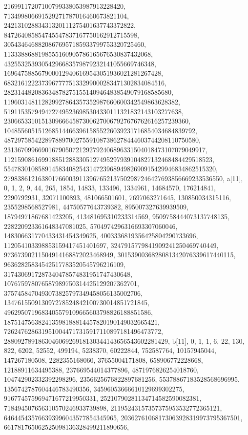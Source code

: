 {{{   21699117207100799338053987913228420, 713499806691529271787016460673821104, 
   24213102883431320111275401637743372822, 
   847264085854745547837167750162912715598, 
   30543464688208676957185933799753320725460, 
   1133388688198555160905786165676530837432068, 
   43255325393054296683579879232141055669746348, 
   1696475885679000129406169543051936021281267428, 
   68321612223739677775133299000283471302834084516, 
   2823144820836348782751551409464838549079168585680, 
   119603148112829927864357352987660600342549863628382, 
   5191153579494727495236985304330111321832143103277638, 
   230665331015130966645873006270067927676762616257239360, 
   10485560515126851446639615855226039231716854034684839792, 
   487297585422897889700275591087386278444603744208110750580, 
   23136709966901679050721292792406896331504018473107079049917, 
   1121590861699188512883305127495297939104827132468484429518523, 
   55478301085891458340825431472396894982690915429946834862515320, 
   2798386121638017660039113967652137502987246427693856669233536550}}, 
 {a[11], {0, 1, 2, 9, 44, 265, 1854, 14833, 133496, 1334961, 14684570, 
   176214841, 2290792931, 32071100893, 481066501601, 7697063271645, 
   130850034315116, 2355298568527981, 44750577643739382, 895007327639939509, 
   18794971867681423205, 413481695310233314569, 9509758444073137748135, 
   228220923361648347081025, 5704974296316693307060046, 
   148306631770433431454349625, 4003336819356425804290733696, 
   112054103398853159417451401697, 3247915779841909241250469740449, 
   97367390211504914168872023468949, 3015390036828081342076339617440115, 
   96362825834542517783520545796216109, 
   3174306917287340478574831951747430648, 
   107675978076587989750314425129207362701, 
   3757458470493073825797349458056135002706, 
   134761550913097278524842100730014851721845, 
   4962950719683405579109665603798826188851586, 
   187514756382413598188814457820190149032665421, 
   7262476286319510044717315917110897181496473772, 
   288092789186304606926918130344143656543602281429}}, 
 {b[11], {0, 1, 1, 6, 22, 130, 822, 6202, 52552, 499194, 5238370, 60222844, 
   752587764, 10157945044, 147267180508, 2282355168060, 37655004171808, 
   658906772228668, 12188911634495388, 237669544014377896, 
   4871976826254018760, 104742902332392298296, 2356625676822897681256, 
   55378867183528568696995, 1356742787604446783490356, 
   34596053666610129699302275, 916774575969471677219950331, 
   25210790281134714582590082381, 718494507656310570246933739898, 
   21195243157357375953532772365121, 646445435766393996043577854345965, 
   20362761068173063928319973795367501, 661781765062525098136328499211890656, 
}}}
